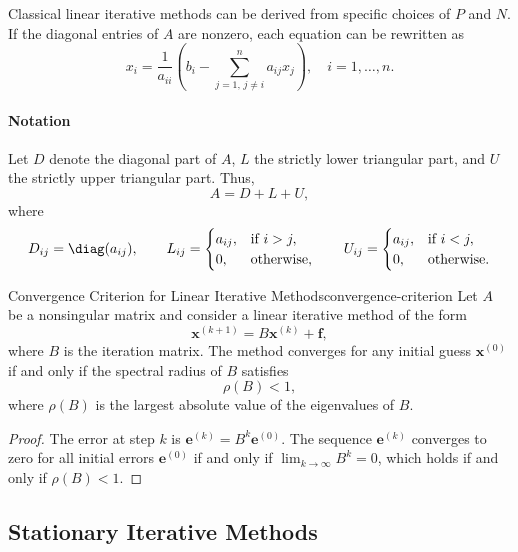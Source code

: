 Classical linear iterative methods can be derived from specific choices of \(P\) and \(N\).
If the diagonal entries of \(A\) are nonzero, each equation can be rewritten as
\begin{equation}
    x_i = \frac{1}{a_{ii}}\left(b_i - \sum_{j=1,\,j\neq i}^n a_{ij} x_j\right), \quad i = 1,\ldots,n.
\end{equation}

\paragraph{Notation}
Let \(D\) denote the diagonal part of \(A\), \(L\) the strictly lower triangular part, and \(U\) the strictly upper triangular part. Thus,
\[
    A = D + L + U,
\]
where
\[
    D_{ij} = \diag(a_{ij}),
    \qquad
    L_{ij} = \begin{cases}
        a_{ij}, & \text{if } i > j, \\
        0,      & \text{otherwise},
    \end{cases}
    \qquad
    U_{ij} =
    \begin{cases}
        a_{ij}, & \text{if } i < j, \\
        0,      & \text{otherwise}.
    \end{cases}
\]

\begin{theorem}{Convergence Criterion for Linear Iterative Methods}{convergence-criterion}
    Let \(A\) be a nonsingular matrix and consider a linear iterative method of the form
    \[
        \mathbf{x}^{(k+1)} = B\mathbf{x}^{(k)} + \mathbf{f},
    \]
    where \(B\) is the iteration matrix. The method converges for any initial guess \(\mathbf{x}^{(0)}\) if and only if the spectral radius of \(B\) satisfies
    \[
        \rho(B) < 1,
    \]
    where \(\rho(B)\) is the largest absolute value of the eigenvalues of \(B\).
\end{theorem}
\begin{proof}
    The error at step \(k\) is \(\mathbf{e}^{(k)} = B^k \mathbf{e}^{(0)}\). The sequence \(\mathbf{e}^{(k)}\) converges to zero for all initial errors \(\mathbf{e}^{(0)}\) if and only if \(\lim_{k\to\infty} B^k = 0\), which holds if and only if \(\rho(B) < 1\).
\end{proof}

\subsection{Stationary Iterative Methods}

